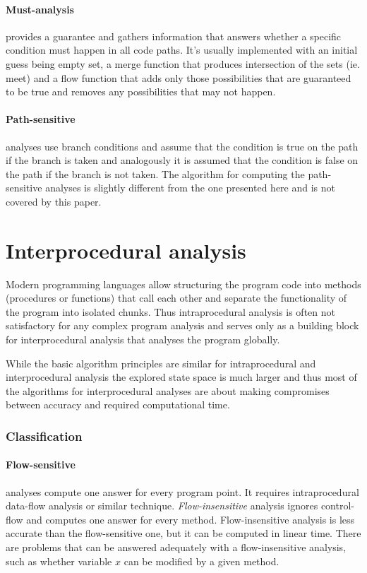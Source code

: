 \paragraph{Must-analysis} provides a guarantee and gathers information that answers whether a specific condition must happen in all code paths. It's usually implemented with an initial guess being empty set, a merge function that produces intersection of the sets (ie. meet) and a flow function that adds only those possibilities that are guaranteed to be true and removes any possibilities that may not happen.

\paragraph{Path-sensitive} analyses use branch conditions and assume that the condition is true on the path if the branch is taken and analogously it is assumed that the condition is false on the path if the branch is not taken. The algorithm for computing the path-sensitive analyses is slightly different from the one presented here and is not covered by this paper.

\section{Interprocedural analysis}

Modern programming languages allow structuring the program code into methods (procedures or functions) that call each other and separate the functionality of the program into isolated chunks. Thus intraprocedural analysis is often not satisfactory for any complex program analysis and serves only as a building block for interprocedural analysis that analyses the program globally.

While the basic algorithm principles are similar for intraprocedural and interprocedural analysis the explored state space is much larger and thus most of the algorithms for interprocedural analyses are about making compromises between accuracy and required computational time.

\subsubsection{Classification}

\paragraph{Flow-sensitive} analyses compute one answer for every program point. It requires intraprocedural data-flow analysis or similar technique. \emph{Flow-insensitive} analysis ignores control-flow and computes one answer for every method. Flow-insensitive analysis is less accurate than the flow-sensitive one, but it can be computed in linear time. There are problems that can be answered adequately with a flow-insensitive analysis, such as whether variable $x$ can be modified by a given method.

